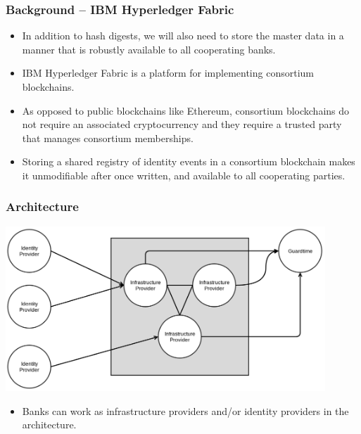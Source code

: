 \documentclass[8pt,final,xcolor={usenames,x11names}]{beamer}
\begin{document}
\begin{frame}
\frametitle{Background – IBM Hyperledger Fabric}

\begin{itemize}
 \item In addition to hash digests, we will also need to store the master data in a manner that is robustly available to all cooperating banks.
 \item IBM Hyperledger Fabric is a platform for implementing consortium blockchains.
 \item As opposed to public blockchains like Ethereum, consortium blockchains do not require an associated cryptocurrency and they require a trusted party that manages consortium memberships.
 \item Storing a shared registry of identity events in a consortium blockchain makes it unmodifiable after once written, and available to all cooperating parties.
\end{itemize}

\end{frame}

\begin{frame}
\frametitle{Architecture}

\includegraphics[width=0.9\textwidth]{./deployment.png}

\begin{itemize}
 \item Banks can work as infrastructure providers and/or identity providers in the architecture.
\end{itemize}

\end{frame}
\end{document}
